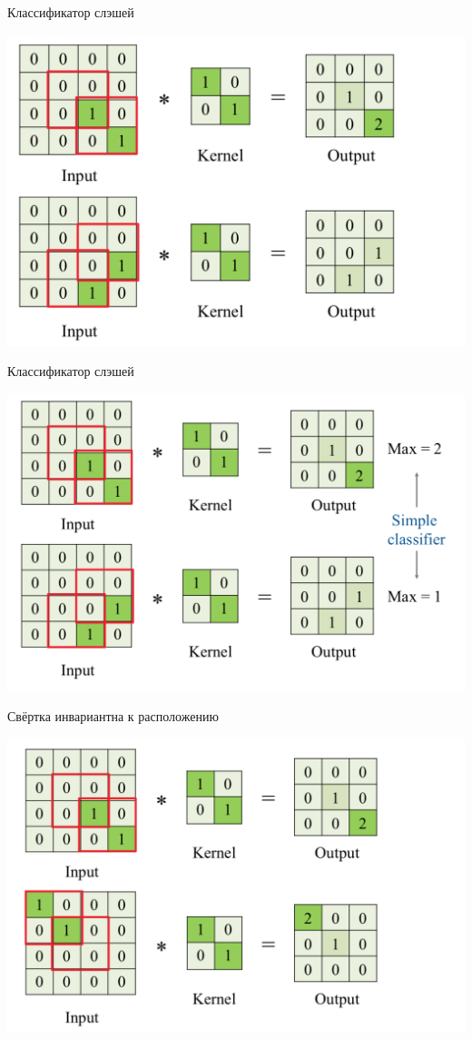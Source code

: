 \documentclass[notes,12pt, aspectratio=169]{beamer}
\begin{document}
\begin{frame}{Классификатор слэшей}
\begin{center}
	\includegraphics[width=.75\linewidth]{conv_1.png}
\end{center}
\end{frame}


\begin{frame}{Классификатор слэшей}
\begin{center}
	\includegraphics[width=.8\linewidth]{conv_2.png}
\end{center}
\end{frame}


\begin{frame}{Свёртка инвариантна к расположению}
\begin{center}
	\includegraphics[width=.8\linewidth]{conv_3.png}
\end{center}
\end{frame}
\end{document}
